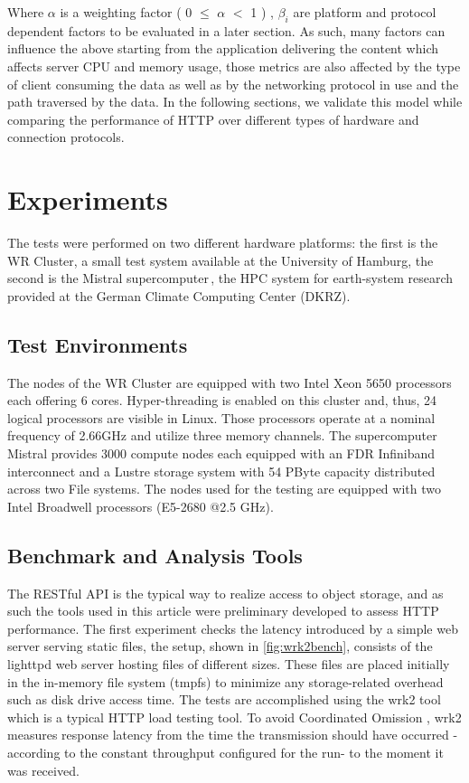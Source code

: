 \documentclass[runningheads]{llncs}
\begin{document}
Where $\alpha$ is a weighting factor ( 0 $\leq$ $\alpha$ $<$ 1 ) \cite{rfc6298}, $\beta_i$ are platform and protocol dependent factors to be evaluated in a later section.
As such, many factors can influence the above starting from the application delivering the content which affects server CPU and memory usage, those metrics are also affected by the type of client consuming the data as well as by the networking protocol in use and the path traversed by the data. In the following sections, we validate this model while comparing the performance of HTTP over different types of hardware and connection protocols.

\section{Experiments}
\label{sec:experiments}

The tests were performed on two different hardware platforms: the first is the WR Cluster, a small test system available at the University of Hamburg, the second is the Mistral supercomputer\,\cite{mistral}, the HPC system for earth-system research provided at the German Climate Computing Center (DKRZ).


\subsection{Test Environments}
The nodes of the WR Cluster are equipped with two Intel Xeon 5650 processors each offering 6 cores. Hyper-threading is enabled on this cluster and, thus, 24 logical processors are visible in Linux. Those processors operate at a nominal frequency of 2.66GHz and utilize three memory channels.
The supercomputer Mistral \cite{mistral} provides 3000 compute nodes each equipped with an FDR Infiniband interconnect and a Lustre storage system with 54 PByte capacity distributed across two File systems. The nodes used for the testing are equipped with two Intel Broadwell processors (E5-2680 @2.5 GHz).


\subsection{Benchmark and Analysis Tools}\label{subsec:benchmark1}

The RESTful API is the typical way to realize access to object storage, and as such the tools used in this article were preliminary developed to assess HTTP performance.
The first experiment checks the latency introduced by a simple web server serving static files, the setup, shown in \cref{fig:wrk2bench}, consists of the lighttpd web server \cite{lighttpd} hosting files of different sizes. These files are placed initially in the in-memory file system (tmpfs) to minimize any storage-related overhead such as disk drive access time. The tests are accomplished using the wrk2 tool \cite{wrk2URL} which is a typical HTTP load testing tool. To avoid Coordinated Omission \cite{wrk2URL}, wrk2 measures response latency from the time the transmission should have occurred - according to the constant throughput configured for the run- to the moment it was received.
\end{document}
